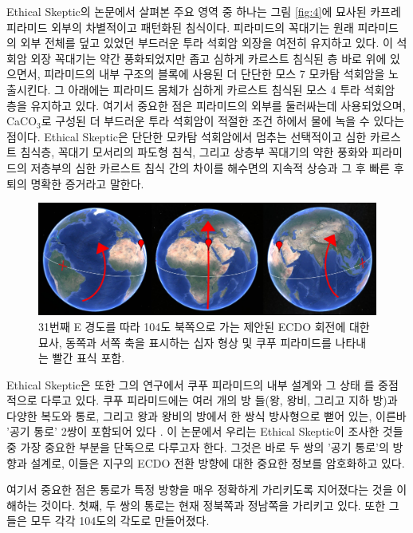 \documentclass[10pt,twocolumn,letterpaper]{article}
\begin{document}
Ethical Skeptic의 논문에서 살펴본 주요 영역 중 하나는 그림 \ref{fig:4}에 묘사된 카프레 피라미드 외부의 차별적이고 패턴화된 침식이다. 피라미드의 꼭대기는 원래 피라미드의 외부 전체를 덮고 있었던 부드러운 투라 석회암 외장을 여전히 유지하고 있다. 이 석회암 외장 꼭대기는 약간 풍화되었지만 좁고 심하게 카르스트 침식된 층 바로 위에 있으면서,  피라미드의 내부 구조의 블록에 사용된 더 단단한 모스 7 모카탐 석회암을 노출시킨다. 그 아래에는 피라미드 몸체가 심하게 카르스트 침식된 모스 4 투라 석회암 층을 유지하고 있다. 여기서 중요한 점은 피라미드의 외부를 둘러싸는데  사용되었으며, CaCO$_3$로 구성된 더 부드러운 투라 석회암이 적절한 조건 하에서 물에 녹을 수 있다는 점이다. Ethical Skeptic은 단단한 모카탐 석회암에서 멈추는 선택적이고 심한 카르스트 침식층, 꼭대기 모서리의 파도형 침식, 그리고 상층부 꼭대기의 약한 풍화와 피라미드의 저층부의 심한 카르스트 침식 간의 차이를 해수면의 지속적 상승과 그 후 빠른 후퇴의 명확한 증거라고 말한다\cite{27}.

\begin{figure}[t]
\begin{center}
\includegraphics[width=1\textwidth]{drawing.jpg}
\end{center}                                                                                 
   \caption{31번째 E 경도를 따라 104도 북쪽으로 가는 제안된 ECDO 회전에 대한 묘사, 동쪽과 서쪽 축을 표시하는 십자 형상 및 쿠푸 피라미드를 나타내는 빨간 표식 포함.}
\label{fig:6}
\end{figure}

Ethical Skeptic은 또한 그의 연구에서 쿠푸 피라미드의 내부 설계와 그 상태 \cite{28}를 중점적으로 다루고 있다. 쿠푸 피라미드에는 여러 개의 방 들(왕, 왕비, 그리고 지하 방)과 다양한 복도와 통로, 그리고 왕과 왕비의 방에서 한 쌍식 방사형으로 뻗어 있는, 이른바  '공기 통로' 2쌍이 포함되어 있다 \cite{29,30}. 이 논문에서 우리는 Ethical Skeptic이 조사한 것들 중 가장 중요한 부분을 단독으로 다루고자 한다. 그것은 바로 두 쌍의 '공기 통로'의 방향과 설계로, 이들은 지구의 ECDO 전환 방향에 대한 중요한 정보를 암호화하고 있다.

여기서 중요한 점은 통로가 특정 방향을 매우 정확하게 가리키도록 지어졌다는 것을 이해하는 것이다. 첫째, 두 쌍의 통로는 현재 정북쪽과 정남쪽을 가리키고 있다. 또한 그들은 모두 각각 104도의 각도로 만들어졌다.
\end{document}
